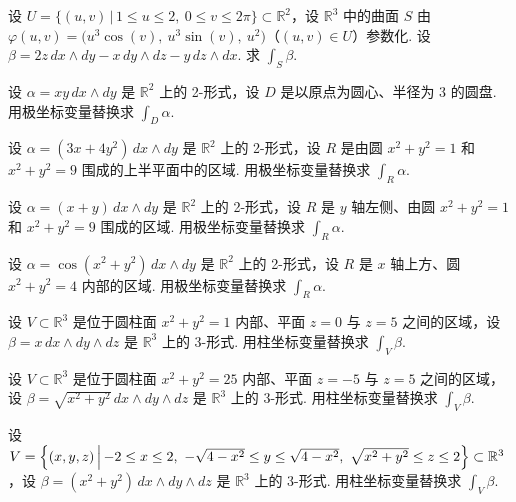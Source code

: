 \begin{question}\label{q:7-30}
设 $U=\bigl\{(u,v)\,\bigl|\,1\leq u\leq 2,\ 0\leq v\leq 2\pi\bigr\}\subset\mathbb{R}^2$，设 $\mathbb{R}^3$ 中的曲面 $S$ 由 $\varphi(u,v)=\bigl(u^3\cos(v),\ u^3\sin(v),\ u^2\bigr)$（$(u,v)\in U$）参数化. 设 $\beta=2z\,dx\wedge dy-x\,dy\wedge dz-y\,dz\wedge dx$. 求 $\int_S\beta$.
\end{question}

\begin{question}\label{q:7-31}
设 $\alpha=xy\,dx\wedge dy$ 是 $\mathbb{R}^2$ 上的 2-形式，设 $D$ 是以原点为圆心、半径为 3 的圆盘. 用极坐标变量替换求 $\int_D\alpha$.
\end{question}

\begin{question}\label{q:7-32}
设 $\alpha=(3x+4y^2)\,dx\wedge dy$ 是 $\mathbb{R}^2$ 上的 2-形式，设 $R$ 是由圆 $x^2+y^2=1$ 和 $x^2+y^2=9$ 围成的上半平面中的区域. 用极坐标变量替换求 $\int_R\alpha$.
\end{question}

\begin{question}\label{q:7-33}
设 $\alpha=(x+y)\,dx\wedge dy$ 是 $\mathbb{R}^2$ 上的 2-形式，设 $R$ 是 $y$ 轴左侧、由圆 $x^2+y^2=1$ 和 $x^2+y^2=9$ 围成的区域. 用极坐标变量替换求 $\int_R\alpha$.
\end{question}

\begin{question}\label{q:7-34}
设 $\alpha=\cos(x^2+y^2)\,dx\wedge dy$ 是 $\mathbb{R}^2$ 上的 2-形式，设 $R$ 是 $x$ 轴上方、圆 $x^2+y^2=4$ 内部的区域. 用极坐标变量替换求 $\int_R\alpha$.
\end{question}

\begin{question}\label{q:7-35}
设 $V\subset\mathbb{R}^3$ 是位于圆柱面 $x^2+y^2=1$ 内部、平面 $z=0$ 与 $z=5$ 之间的区域，设 $\beta=x\,dx\wedge dy\wedge dz$ 是 $\mathbb{R}^3$ 上的 3-形式. 用柱坐标变量替换求 $\int_V\beta$.
\end{question}

\begin{question}\label{q:7-36}
设 $V\subset\mathbb{R}^3$ 是位于圆柱面 $x^2+y^2=25$ 内部、平面 $z=-5$ 与 $z=5$ 之间的区域，设 $\beta=\sqrt{x^2+y^2}\,dx\wedge dy\wedge dz$ 是 $\mathbb{R}^3$ 上的 3-形式. 用柱坐标变量替换求 $\int_V\beta$.
\end{question}

\begin{question}\label{q:7-37}
设 $V=\Bigl\{(x,y,z)\,\Bigl|\,-2\leq x\leq 2,\ -\sqrt{4-x^2}\leq y\leq\sqrt{4-x^2},\ \sqrt{x^2+y^2}\leq z\leq 2\Bigr\}\subset\mathbb{R}^3$，设 $\beta=(x^2+y^2)\,dx\wedge dy\wedge dz$ 是 $\mathbb{R}^3$ 上的 3-形式. 用柱坐标变量替换求 $\int_V\beta$.
\end{question}

